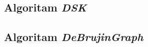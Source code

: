 \documentclass[12pt,oneside]{memoir}
\begin{document}
% 




\subsection{Algoritam \textit{DSK}}


% 


\subsection{Algoritam \textit{DeBrujinGraph}}
\label{odeljak:debrujinRezultati}

\end{document}
